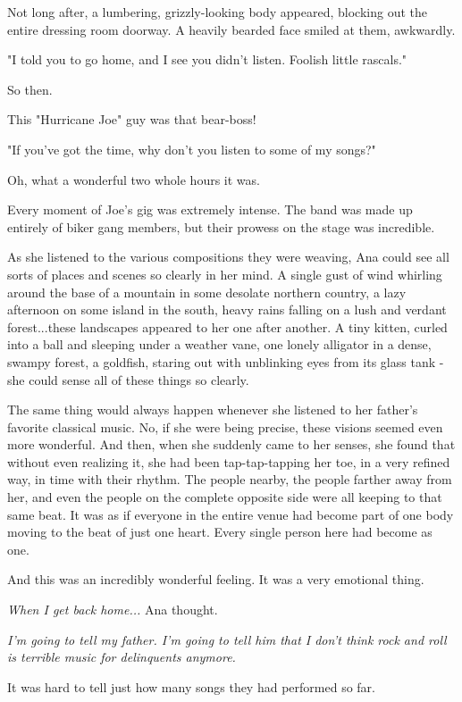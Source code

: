\documentclass[
]{article}
\begin{document}
Not long after, a lumbering, grizzly-looking body appeared, blocking out
the entire dressing room doorway. A heavily bearded face smiled at them,
awkwardly.

"I told you to go home, and I see you didn't listen. Foolish little
rascals."

So then.

This "Hurricane Joe" guy was that bear-boss!

"If you've got the time, why don't you listen to some of my songs?"

Oh, what a wonderful two whole hours it was.

Every moment of Joe's gig was extremely intense. The band was made up
entirely of biker gang members, but their prowess on the stage was
incredible.

As she listened to the various compositions they were weaving, Ana could
see all sorts of places and scenes so clearly in her mind. A single gust
of wind whirling around the base of a mountain in some desolate northern
country, a lazy afternoon on some island in the south, heavy rains
falling on a lush and verdant forest...these landscapes appeared to her
one after another. A tiny kitten, curled into a ball and sleeping under
a weather vane, one lonely alligator in a dense, swampy forest, a
goldfish, staring out with unblinking eyes from its glass tank - she
could sense all of these things so clearly.

The same thing would always happen whenever she listened to her father's
favorite classical music. No, if she were being precise, these visions
seemed even more wonderful. And then, when she suddenly came to her
senses, she found that without even realizing it, she had been
tap-tap-tapping her toe, in a very refined way, in time with their
rhythm. The people nearby, the people farther away from her, and even
the people on the complete opposite side were all keeping to that same
beat. It was as if everyone in the entire venue had become part of one
body moving to the beat of just one heart. Every single person here had
become as one.

And this was an incredibly wonderful feeling. It was a very emotional
thing.

\emph{When I get back home...} Ana thought.

\emph{I'm going to tell my father. I'm going to tell him that I don't
think rock and roll is terrible music for delinquents anymore.}

It was hard to tell just how many songs they had performed so far.
\end{document}
